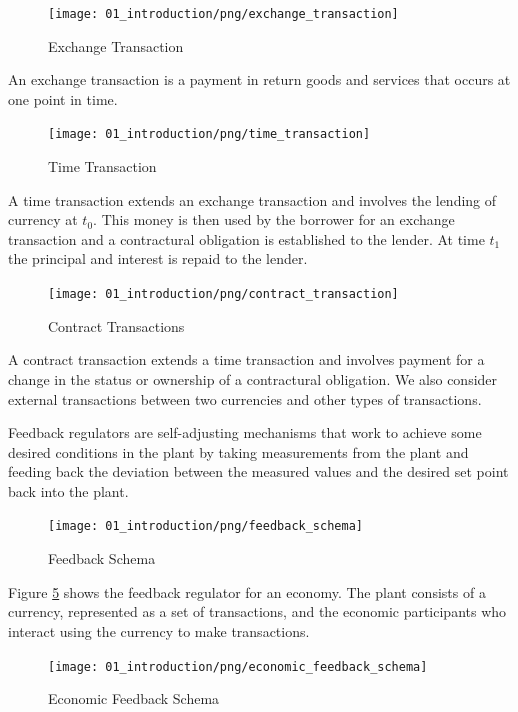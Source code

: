 \begin{figure}[H]
\centering
\texttt{[image: 01\_introduction/png/exchange\_transaction]}
\caption{Exchange Transaction}
\label{fig:exchange_transaction1}
\end{figure}

An exchange transaction is a payment in return goods and services that occurs at one
point in time.

\begin{figure}[H]
\centering
\texttt{[image: 01\_introduction/png/time\_transaction]}
\caption{Time Transaction}
\label{fig:time_transaction1}
\end{figure}

A time transaction extends an exchange transaction and involves the lending of currency at $t_0$.
This money is then used by the borrower for an exchange transaction and a contractural obligation is
established to the lender. At time $t_1$ the principal and interest is repaid to the lender.

\begin{figure}[H]
\centering
\texttt{[image: 01\_introduction/png/contract\_transaction]}
\caption{Contract Transactions}
\label{fig:contract_transaction1}
\end{figure}

A contract transaction extends a time transaction and involves payment for a change in the status or
ownership of a contractural obligation. We also consider external transactions between two
currencies and other types of transactions.

Feedback regulators are self-adjusting mechanisms that work to achieve some desired conditions in
the plant by taking measurements from the plant and feeding back the deviation between the measured
values and the desired set point back into the plant.

\begin{figure}[H]
\centering
\texttt{[image: 01\_introduction/png/feedback\_schema]}
\caption{Feedback Schema}
\label{fig:feedback_schema1}
\end{figure}

Figure \ref{fig:economic_feedback_schema1} shows the feedback regulator for an economy. The plant
consists of a currency, represented as a set of transactions, and the economic participants who
interact using the currency to make transactions.

\begin{figure}[H]
\centering
\texttt{[image: 01\_introduction/png/economic\_feedback\_schema]}
\caption{Economic Feedback Schema}
\label{fig:economic_feedback_schema1}
\end{figure}

